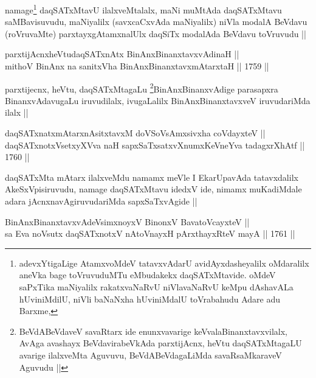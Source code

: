 \begin{artha}
namage\footnote[1]{adevxYtigaLige AtamxvoMdeV tatavxvAdarU
  avidAyxdasheyalilx oMdaralilx aneVka bage toVruvuduMTu eMbudakekx
  daqSATxMtavide. oMdeV saPxTika maNiyalilx rakatxvaNaRvU niVlavaNaRvU
  keMpu dAshavALa hUviniMdilU, niVli baNaNxha hUviniMdalU toVrabahudu
  Adare adu Barxme,} daqSATxMtavU ilalxveMtalalx, maNi muMtAda
daqSATxMtavu saMBavisuvudu, maNiyalilx (savxcaCxvAda maNiyalilx) niVla
modalA BeVdavu (roVruvaMte) parxtayxgAtamxnalUlx daqSiTx modalAda
BeVdavu toVruvudu ||
\end{artha}


\begin{shl}
parxtijAcnxheVtudaqSATxnAtx BinAnxBinanxtavxvAdinaH || \\
mithoV BinAnx na sanitxVha BinAnxBinanxtavxmAtarxtaH ||  1759 ||  
\end{shl}

\begin{artha}
  parxtijecnx, heVtu, daqSATxMtagaLu \footnote[2]{BeVdABeVdaveV
    savaRtarx ide enunxvavarige keVvalaBinanxtavxvilalx, AvAga
    avashayx BeVdavirabeVkAda parxtijAcnx, heVtu daqSATxMtagaLU
    avarige ilalxveMta Aguvuvu, BeVdABeVdagaLiMda savaRsaMkaraveV
    Aguvudu ||}BinAnxBinanxvAdige
  parasapxra BinanxvAdavugaLu iruvudilalx, ivugaLalilx
  BinAnxBinanxtavxveV iruvudariMda ilalx ||
\end{artha}

\begin{shl}
daqSATxnatxmAtarxnAsitxtavxM doVSoV\s sAmxsivxha coVdayxteV || \\
daqSATxnotxV\s setxyXVva naH sapxSaTxsatxvXnumxKeVneYva tadagxrXhAtf ||  1760 ||  
\end{shl}

\begin{artha}
daqSATxMta mAtarx ilalxveMdu namamx meVle I EkarUpavAda tatavxdalilx
AkeSxVpisiruvudu, namage daqSATxMtavu idedxV ide, nimamx muKadiMdale
adara jAcnxnavAgiruvudariMda sapxSaTxvAgide ||
\end{artha}


\begin{shl}
BinAnxBinanxtavxvAdeV\s simxnoyxV BinonxV BavatoVcayxteV || \\
sa Eva noV\s sutx daqSATxnotxV nAtoV\s nayxH pArxthayxRteV mayA ||  1761 ||  
\end{shl}

